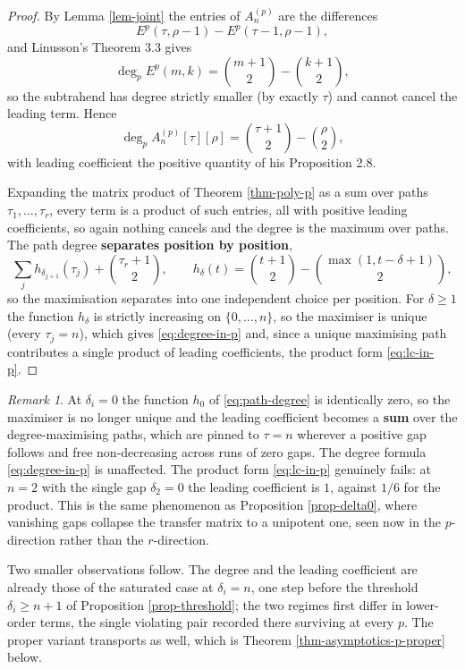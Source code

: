 \documentclass[11pt, a4paper, abstract=yes]{scrartcl}
\theoremstyle{definition}
\theoremstyle{remark}
\newtheorem{remark}[definition]{Remark}
\theoremstyle{plain}
\begin{document}
\begin{proof}
By Lemma \ref{lem-joint} the entries of \(A^{(p)}_n\) are the differences
\[
  E^p(\tau,\rho-1)-E^p(\tau-1,\rho-1),
\]
and Linusson's Theorem 3.3 gives
\[
  \deg_pE^p(m,k)=\binom{m+1}{2}-\binom{k+1}{2},
\]
so the subtrahend has degree
strictly smaller (by exactly \(\tau\)) and cannot cancel the leading term. Hence
\[
  \deg_pA^{(p)}_n[\tau][\rho]=\binom{\tau+1}{2}-\binom{\rho}{2},
\]
with leading coefficient the positive quantity
of his Proposition 2.8.

Expanding the matrix product of Theorem \ref{thm-poly-p} as a sum over paths
\(\tau_1,\dots,\tau_r\), every term is a product of such entries, all with positive leading
coefficients, so again nothing cancels and the degree is the maximum over paths. The path degree
\textbf{separates position by position},
\begin{equation}\label{eq:path-degree}
  \sum_{j}h_{\delta_{j+1}}(\tau_j)+\binom{\tau_r+1}{2},
  \qquad h_\delta(t)=\binom{t+1}{2}-\binom{\max(1,t-\delta+1)}{2},
\end{equation}
so the maximisation separates into one independent choice per position. For \(\delta\ge1\)
the function \(h_\delta\) is strictly increasing on \(\lbrace0,\dots,n\rbrace\), so the maximiser is
unique (every \(\tau_j=n\)), which gives \eqref{eq:degree-in-p} and, since a unique maximising
path contributes a single product of leading coefficients, the product form \eqref{eq:lc-in-p}.
\end{proof}

\begin{remark}
At \(\delta_i=0\) the function \(h_0\) of \eqref{eq:path-degree} is identically zero, so the
maximiser is no longer unique and the leading coefficient becomes a \textbf{sum} over the degree-maximising
paths, which are pinned to \(\tau=n\) wherever a positive gap follows and free non-decreasing
across runs of zero gaps. The degree formula \eqref{eq:degree-in-p} is unaffected. The product form
\eqref{eq:lc-in-p} genuinely fails: at \(n=2\) with the single gap \(\delta_2=0\) the leading
coefficient is \(1\), against \(1/6\) for the product. This is the same phenomenon as
Proposition \ref{prop-delta0}, where vanishing gaps collapse the transfer matrix to a unipotent one,
seen now in the \(p\)-direction rather than the \(r\)-direction.

Two smaller observations follow. The degree and the leading coefficient are already those of the
saturated case at \(\delta_i=n\), one step before the threshold \(\delta_i\ge n+1\) of
Proposition \ref{prop-threshold}; the two regimes first differ in lower-order terms, the single
violating pair recorded there surviving at every \(p\). The proper variant transports as well,
which is Theorem \ref{thm-asymptotics-p-proper} below.
\label{rem-asymptotics-zero-gaps}
\end{remark}
\end{document}
